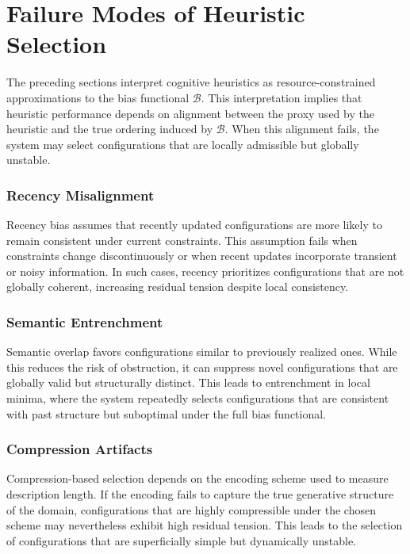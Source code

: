 \documentclass[11pt]{article}
\theoremstyle{plain}
\theoremstyle{definition}
\theoremstyle{remark}
\begin{document}
\section{Failure Modes of Heuristic Selection}

The preceding sections interpret cognitive heuristics as resource-constrained approximations to the bias functional $\mathcal{B}$. This interpretation implies that heuristic performance depends on alignment between the proxy used by the heuristic and the true ordering induced by $\mathcal{B}$. When this alignment fails, the system may select configurations that are locally admissible but globally unstable.

\subsubsection*{Recency Misalignment}

Recency bias assumes that recently updated configurations are more likely to remain consistent under current constraints. This assumption fails when constraints change discontinuously or when recent updates incorporate transient or noisy information. In such cases, recency prioritizes configurations that are not globally coherent, increasing residual tension despite local consistency.

\subsubsection*{Semantic Entrenchment}

Semantic overlap favors configurations similar to previously realized ones. While this reduces the risk of obstruction, it can suppress novel configurations that are globally valid but structurally distinct. This leads to entrenchment in local minima, where the system repeatedly selects configurations that are consistent with past structure but suboptimal under the full bias functional.

\subsubsection*{Compression Artifacts}

Compression-based selection depends on the encoding scheme used to measure description length. If the encoding fails to capture the true generative structure of the domain, configurations that are highly compressible under the chosen scheme may nevertheless exhibit high residual tension. This leads to the selection of configurations that are superficially simple but dynamically unstable.
\end{document}
